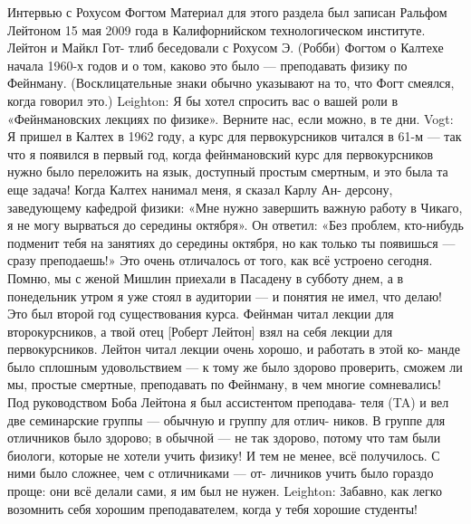 \documentclass[11pt,oneside]{article}
\begin{document}
Интервью с Рохусом Фогтом Материал для этого раздела был записан Ральфом Лейтоном 15 мая 2009 года в Калифорнийском технологическом институте. Лейтон и Майкл Гот- тлиб беседовали с Рохусом Э. (Робби) Фогтом о Калтехе начала 1960-х годов и о том, каково это было --- преподавать физику по Фейнману. (Восклицательные знаки обычно указывают на то, что Фогт смеялся, когда говорил это.) Leighton: Я бы хотел спросить вас о вашей роли в «Фейнмановских лекциях по физике». Верните нас, если можно, в те дни. Vogt: Я пришел в Калтех в 1962 году, а курс для первокурсников читался в 61-м --- так что я появился в первый год, когда фейнмановский курс для первокурсников нужно было переложить на язык, доступный простым смертным, и это была та еще задача! Когда Калтех нанимал меня, я сказал Карлу Ан- дерсону, заведующему кафедрой физики: «Мне нужно завершить важную работу в Чикаго, я не могу вырваться до середины октября». Он ответил: «Без проблем, кто-нибудь подменит тебя на занятиях до середины октября, но как только ты появишься --- сразу преподаешь!» Это очень отличалось от того, как всё устроено сегодня. Помню, мы с женой Мишлин приехали в Пасадену в субботу днем, а в понедельник утром я уже стоял в аудитории --- и понятия не имел, что делаю! Это был второй год существования курса. Фейнман читал лекции для второкурсников, а твой отец [Роберт Лейтон] взял на себя лекции для первокурсников. Лейтон читал лекции очень хорошо, и работать в этой ко- манде было сплошным удовольствием --- к тому же было здорово проверить, сможем ли мы, простые смертные, преподавать по Фейнману, в чем многие сомневались! Под руководством Боба Лейтона я был ассистентом преподава- теля (TA) и вел две семинарские группы --- обычную и группу для отлич- ников. В группе для отличников было здорово; в обычной --- не так здорово, потому что там были биологи, которые не хотели учить физику! И тем не менее, всё получилось. С ними было сложнее, чем с отличниками --- от- личников учить было гораздо проще: они всё делали сами, я им был не нужен. Leighton: Забавно, как легко возомнить себя хорошим преподавателем, когда у тебя хорошие студенты!\par
\end{document}
